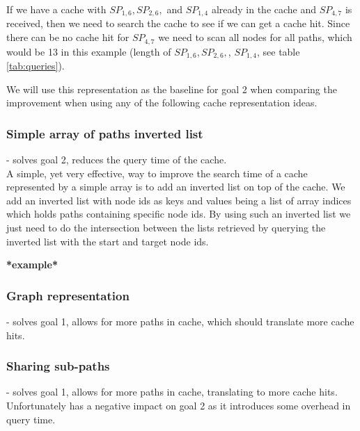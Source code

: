 If we have a cache with $SP_{1,6},SP_{2,6},$ and $SP_{1,4}$ already in the cache and $SP_{4,7}$ is received, then we need to search the cache to see if we can get a cache hit. Since there can be no cache hit for $SP_{4,7}$ we need to scan all nodes for all paths, which would be 13 in this example (length of $SP_{1,6},SP_{2,6},$, $SP_{1,4}$, see table \ref{tab:queries}).

We will use this representation as the baseline for goal 2 when comparing the improvement when using any of the following cache representation ideas.

\subsubsection{Simple array of paths inverted list} - solves goal 2, reduces the query time of the cache.\\
A simple, yet very effective, way to improve the search time of a cache represented by a simple array is to add an inverted list on top of the cache. We add an inverted list with node ids as keys and values being a list of array indices which holds paths containing specific node ids. By using such an inverted list we just need to do the intersection between the lists retrieved by querying the inverted list with the start and target node ids. 


\textbf{*example*}

\subsubsection{Graph representation} - solves goal 1, allows for more paths in cache, which should translate more cache hits.

\subsubsection{Sharing sub-paths} - solves goal 1, allows for more paths in cache, translating to more cache hits. Unfortunately has a negative impact on goal 2 as it introduces some overhead in query time.

